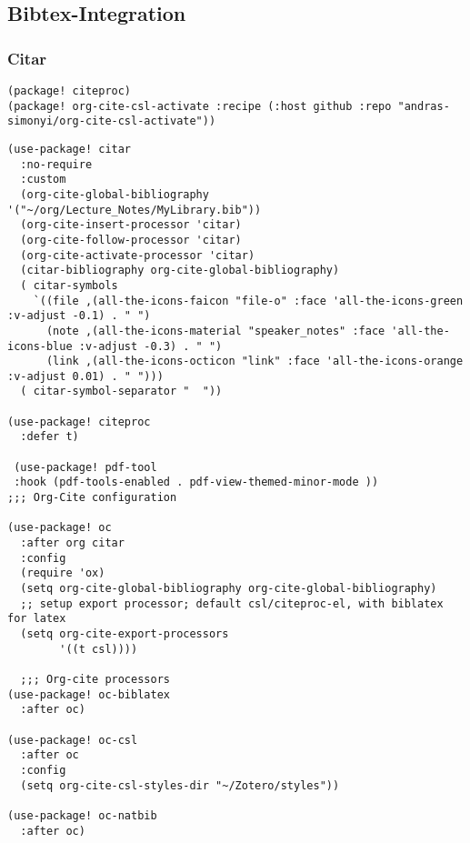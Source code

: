 \documentclass[c]{article}
\theoremstyle{plain}%
\theoremstyle{definition}
\theoremstyle{remark}
\begin{document}
\subsection{Bibtex-Integration}
\label{sec:orgd95d330}
\subsubsection{Citar}
\label{sec:orgcb0df12}
\begin{verbatim}
(package! citeproc)
(package! org-cite-csl-activate :recipe (:host github :repo "andras-simonyi/org-cite-csl-activate"))
\end{verbatim}
\begin{verbatim}
(use-package! citar
  :no-require
  :custom
  (org-cite-global-bibliography '("~/org/Lecture_Notes/MyLibrary.bib"))
  (org-cite-insert-processor 'citar)
  (org-cite-follow-processor 'citar)
  (org-cite-activate-processor 'citar)
  (citar-bibliography org-cite-global-bibliography)
  ( citar-symbols
    `((file ,(all-the-icons-faicon "file-o" :face 'all-the-icons-green :v-adjust -0.1) . " ")
      (note ,(all-the-icons-material "speaker_notes" :face 'all-the-icons-blue :v-adjust -0.3) . " ")
      (link ,(all-the-icons-octicon "link" :face 'all-the-icons-orange :v-adjust 0.01) . " ")))
  ( citar-symbol-separator "  "))

(use-package! citeproc
  :defer t)

 (use-package! pdf-tool
 :hook (pdf-tools-enabled . pdf-view-themed-minor-mode ))
;;; Org-Cite configuration

(use-package! oc
  :after org citar
  :config
  (require 'ox)
  (setq org-cite-global-bibliography org-cite-global-bibliography)
  ;; setup export processor; default csl/citeproc-el, with biblatex for latex
  (setq org-cite-export-processors
        '((t csl))))

  ;;; Org-cite processors
(use-package! oc-biblatex
  :after oc)

(use-package! oc-csl
  :after oc
  :config
  (setq org-cite-csl-styles-dir "~/Zotero/styles"))

(use-package! oc-natbib
  :after oc)


\end{verbatim}
\end{document}
